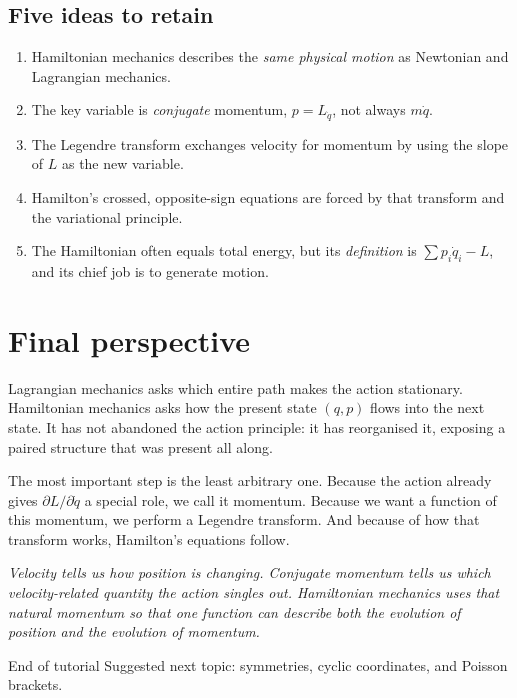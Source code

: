 \documentclass[11pt,a4paper,oneside]{article}
\begin{document}
\subsection*{Five ideas to retain}
\begin{enumerate}[leftmargin=22pt]
 \item Hamiltonian mechanics describes the \emph{same physical motion} as Newtonian and Lagrangian mechanics.
 \item The key variable is \emph{conjugate} momentum, $p=L_{\dot q}$, not always $m\dot q$.
 \item The Legendre transform exchanges velocity for momentum by using the slope of $L$ as the new variable.
 \item Hamilton's crossed, opposite-sign equations are forced by that transform and the variational principle.
 \item The Hamiltonian often equals total energy, but its \emph{definition} is $\sum p_i\dot q_i-L$, and its chief job is to generate motion.
\end{enumerate}

\section*{Final perspective}
Lagrangian mechanics asks which entire path makes the action stationary. Hamiltonian mechanics asks how the present state $(q,p)$ flows into the next state. It has not abandoned the action principle: it has reorganised it, exposing a paired structure that was present all along.

The most important step is the least arbitrary one. Because the action already gives $\partial L/\partial\dot q$ a special role, we call it momentum. Because we want a function of this momentum, we perform a Legendre transform. And because of how that transform works, Hamilton's equations follow.

\begin{intuition}[title={\strut The thought worth taking away}]
\emph{Velocity tells us how position is changing. Conjugate momentum tells us which velocity-related quantity the action singles out. Hamiltonian mechanics uses that natural momentum so that one function can describe both the evolution of position and the evolution of momentum.}
\end{intuition}

\vfill
{\color{ink!55}\small End of tutorial \quad\textbullet\quad Suggested next topic: symmetries, cyclic coordinates, and Poisson brackets.}
\end{document}
